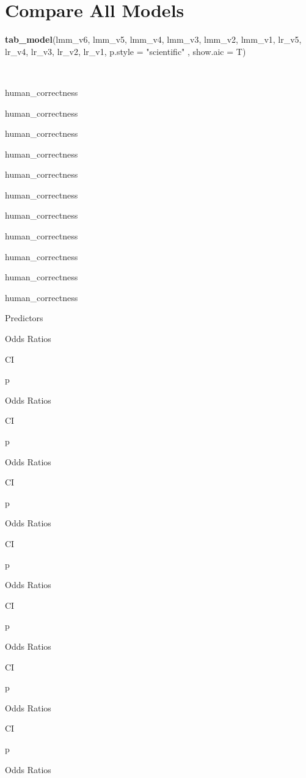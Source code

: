 \documentclass[
]{article}
\newenvironment{Shaded}{\begin{snugshade}}{\end{snugshade}}
\newcommand{\AttributeTok}[1]{\textcolor[rgb]{0.13,0.29,0.53}{#1}}
\newcommand{\FunctionTok}[1]{\textcolor[rgb]{0.13,0.29,0.53}{\textbf{#1}}}
\newcommand{\NormalTok}[1]{#1}
\newcommand{\StringTok}[1]{\textcolor[rgb]{0.31,0.60,0.02}{#1}}
\begin{document}
\hypertarget{compare-all-models}{%
\section{Compare All Models}\label{compare-all-models}}

\begin{Shaded}
\begin{Highlighting}[]
\FunctionTok{tab\_model}\NormalTok{(lmm\_v6, lmm\_v5, lmm\_v4, lmm\_v3, lmm\_v2, lmm\_v1,}
\NormalTok{          lr\_v5, lr\_v4, lr\_v3, lr\_v2, lr\_v1,}
          \AttributeTok{p.style =} \StringTok{"scientific"}\NormalTok{ , }\AttributeTok{show.aic =}\NormalTok{ T)}
\end{Highlighting}
\end{Shaded}

~

human\_correctness

human\_correctness

human\_correctness

human\_correctness

human\_correctness

human\_correctness

human\_correctness

human\_correctness

human\_correctness

human\_correctness

human\_correctness

Predictors

Odds Ratios

CI

p

Odds Ratios

CI

p

Odds Ratios

CI

p

Odds Ratios

CI

p

Odds Ratios

CI

p

Odds Ratios

CI

p

Odds Ratios

CI

p

Odds Ratios
\end{document}
